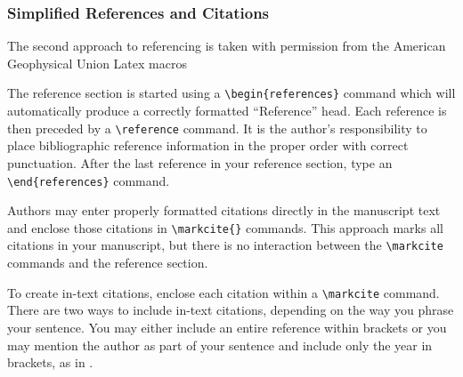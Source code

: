 \documentclass{gji}
\begin{document}
\subsubsection{Simplified References and Citations}

The second approach to referencing is taken with permission from
the American Geophysical Union Latex macros\pagebreak

The reference section is started using a
\verb"\begin{references}" command which will
automatically produce a correctly formatted
``Reference'' head.  Each reference is then
preceded by a \verb"\reference"
command.  It is the author's
responsibility to place bibliographic reference
information in the proper order with correct
punctuation.  After the last reference in your
reference section, type an \verb"\end{references}"
command.

Authors may enter properly formatted citations directly
in the manuscript text and enclose those citations in
\verb"\markcite{}" commands.  This approach
marks all citations in your manuscript, but there
is no interaction between the \verb"\markcite"
commands and the reference section.

To create in-text citations, enclose each citation
within a \verb"\markcite" command.
There are two ways to include in-text citations,
depending on the way you phrase your sentence.
You may either include an entire reference within
brackets  or you
may mention the author as part of your sentence and
include only the year in brackets, as in .
\end{document}
